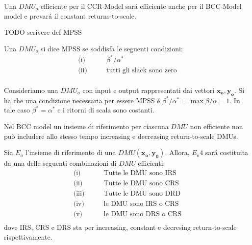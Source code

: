 \begin{teor} Una $DMU_o$ efficiente per il CCR-Model sar\'a efficiente anche per il BCC-Model model e prevar\'a il constant returns-to-scale.
\end{teor}
TODO scrivere def MPSS
\begin{definiz}Una $DMU_o$ si dice MPSS se soddisfa le seguenti condizioni:
\begin{equation}
\begin{split}
\text{(i)} \qquad & \beta^* / \alpha^* \\
\text{(ii)} \qquad & \text{tutti gli slack sono zero}\\
\end{split}
\end{equation}
\end{definiz}
\begin{teor} Consideriamo una $DMU_o$ con input e output rappresentati dai vettori $\boldsymbol{x_o, y_o}$. Si ha che una condizione necessaria per essere MPSS \'e  $\beta^*/\alpha^* = \max \beta/\alpha = 1$. In tale caso $\beta^* = \alpha^*$ e i ritorni di scala sono costanti. 
\end{teor}
\begin{teor} Nel BCC model un insieme di riferimento per ciascuna $DMU$ non efficiente non può includere allo stesso tempo increasing e decreasing return-to-scale DMUs.
\end{teor}
\begin{cor} \label{cor:return-to-scale} 
Sia $E_o$ l'insieme di riferimento di una $DMU(\boldsymbol{x_o, y_0})$. Allora, $E_o4$ sar\'a costituita da una delle seguenti combinazioni di $DMU$ efficienti:
\begin{equation}
\begin{split}
\text{(i)} \qquad & \text{Tutte le DMU sono IRS} \\
\text{(ii)} \qquad & \text{Tutte le DMU sono CRS} \\
\text{(iii)} \qquad & \text{Tutte le DMU sono DRD} \\
\text{(iv)} \qquad & \text{le DMU sono IRS o CRS} \\
\text{(v)} \qquad & \text{le DMU sono DRS o CRS} \\
\end{split}
\end{equation}
dove IRS, CRS e DRS sta per increasing, constant e decresing return-to-scale rispettivamente.
\end{cor}
